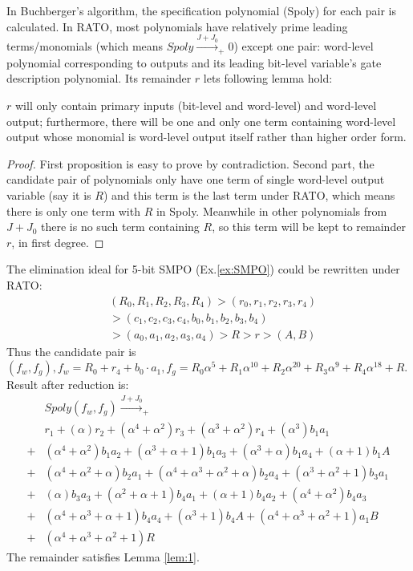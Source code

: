 In Buchberger's algorithm, the specification polynomial (Spoly) for each pair is calculated. In RATO, most polynomials
have relatively prime leading terms/monomials (which means $Spoly \xrightarrow{J+J_0}_{+} 0$) except one pair:
word-level polynomial corresponding to outputs and its leading bit-level variable's gate description polynomial.
Its remainder $r$ lets following lemma hold:

\begin{Lemma}
\label{lem:1}
$r$ will only contain primary inputs (bit-level and word-level) and word-level output; furthermore, there will be one and
only one term containing word-level output whose monomial is word-level output itself rather than higher order form.
\end{Lemma}

\begin{proof}
First proposition is easy to prove by contradiction. Second part, the candidate pair of polynomials only have one term of
single word-level output variable (say it is $R$) and this term is the last term under RATO, which means there is only one term with
$R$ in Spoly. Meanwhile in other polynomials from $J+J_0$ there is no such term containing $R$, so this term will be
kept to remainder $r$, in first degree.
\end{proof}

\begin{Example}
The elimination ideal for 5-bit SMPO (Ex.\ref{ex:SMPO}) could be rewritten under RATO:
\begin{align}
&(R_0,R_1,R_2,R_3,R_4)>(r_0,r_1,r_2,r_3,r_4)\nonumber\\&>(c_1,c_2,c_3,c_4,b_0,b_1,b_2,b_3,b_4)\nonumber\\
&>(a_0,a_1,a_2,a_3,a_4)>R>r>(A,B)\nonumber
\end{align}
Thus the candidate pair is
$(f_w,f_g), f_w = R_0+r_4+b_0\cdot a_1, f_g =R_0\alpha^5+R_1\alpha^{10}+R_2\alpha^{20}+R_3\alpha^9+R_4\alpha^{18} + R$.
Result after reduction is:
\begin{align}
&Spoly(f_w,f_g) \xrightarrow{J+J_0}_{+}\nonumber\\
&r_1+(\alpha)r_2+(\alpha^4+\alpha^2)r_3+(\alpha^3+\alpha^2)r_4+(\alpha^3)b_1a_1\nonumber\\
+&(\alpha^4+\alpha^2)b_1a_2+(\alpha^3+\alpha+1)b_1a_3+(\alpha^3+\alpha)b_1a_4+(\alpha+1)b_1A\nonumber\\
+&(\alpha^4+\alpha^2+\alpha)b_2a_1+(\alpha^4+\alpha^3+\alpha^2+\alpha)b_2a_4+(\alpha^3+\alpha^2+1)b_3a_1\nonumber\\
+&(\alpha)b_3a_3+(\alpha^2+\alpha+1)b_4a_1+(\alpha+1)b_4a_2+(\alpha^4+\alpha^2)b_4a_3\nonumber\\
+&(\alpha^4+\alpha^3+\alpha+1)b_4a_4+(\alpha^3+1)b_4A+(\alpha^4+\alpha^3+\alpha^2+1)a_1B\nonumber\\
+&(\alpha^4+\alpha^3+\alpha^2+1)R\nonumber
\end{align}
The remainder satisfies Lemma \ref{lem:1}.
\end{Example}

